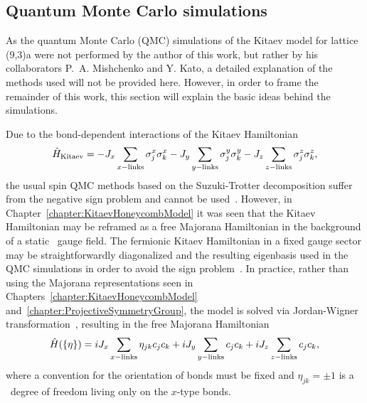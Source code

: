 \subsection{Quantum Monte Carlo simulations}
\label{section:chapter06_QMC}
%
%
As the quantum Monte Carlo (QMC) simulations of the Kitaev model for lattice (9,3)a were not performed by the author of this work, but rather by his collaborators P.~A. Mishchenko and Y. Kato, a detailed explanation of the methods used will not be provided here.
However, in order to frame the remainder of this work, this section will explain the basic ideas behind the simulations.

Due to the bond-dependent interactions of the Kitaev Hamiltonian
%
\begin{equation}
	\hat{H}_{\rm Kitaev} = -J_x \sum_{x {\rm -links}} \sigma_j^x \sigma_k^x - J_y \sum_{y {\rm -links}} \sigma_j^y \sigma_k^y - J_z \sum_{z {\rm -links}} \sigma_j^z \sigma_k^z,
\end{equation}
%
the usual spin QMC methods based on the Suzuki-Trotter decomposition suffer from the negative sign problem and cannot be used~\cite{NasuPRL2014}.
However, in Chapter~\ref{chapter:KitaevHoneycombModel} it was seen that the Kitaev Hamiltonian may be reframed as a free Majorana Hamiltonian in the background of a static \ZZ~gauge field.
The fermionic Kitaev Hamiltonian in a fixed gauge sector may be straightforwardly diagonalized and the resulting eigenbasis used in the QMC simulations in order to avoid the sign problem~\cite{NasuPRL2014}.
In practice, rather than using the Majorana representations seen in Chapters~\ref{chapter:KitaevHoneycombModel} and~\ref{chapter:ProjectiveSymmetryGroup}, the model is solved via Jordan-Wigner transformation~\cite{ChenPRB2007,FengPRL2007,ChenJPA2008}, resulting in the free Majorana Hamiltonian
%
\begin{equation}
	\hat{H}(\{\eta\}) = i J_x \sum_{x {\rm -links}} \eta_{jk} c_j c_k + i J_y \sum_{y {\rm -links}} c_j c_k + i J_z \sum_{z {\rm -links}} c_j c_k,
	\label{eq:chapter06_JWHamiltonian}
\end{equation}
%
where a convention for the orientation of bonds must be fixed and $\eta_{jk} = \pm 1$ is a \ZZ~degree of freedom living only on the $x$-type bonds.

